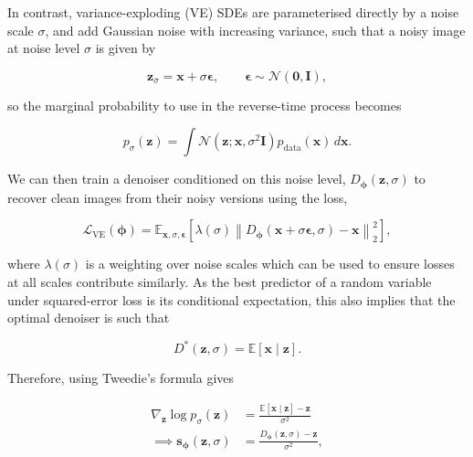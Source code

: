 In contrast, variance-exploding (VE) SDEs are parameterised directly by a noise scale $\sigma$, and add Gaussian noise with increasing variance, such that a noisy image at noise level $\sigma$ is given by

\begin{equation}
\mathbf{z}_\sigma=\mathbf{x}+\sigma\boldsymbol{\epsilon}, \qquad \boldsymbol{\epsilon}\sim\mathcal{N}(\mathbf{0},\mathbf{I}),
\label{eq:ve_noisy_image}
\end{equation}

so the marginal probability to use in the reverse-time process becomes

\begin{equation}
p_\sigma(\mathbf{z})=\int \mathcal{N}(\mathbf{z};\mathbf{x},\sigma^2\mathbf{I})p_{\mathrm{data}}(\mathbf{x})\,d\mathbf{x}.
\label{eq:ve_marginal}
\end{equation}

We can then train a denoiser conditioned on this noise level, $D_{\boldsymbol{\phi}}(\mathbf{z}, \sigma)$ to recover clean images from their noisy versions using the loss,

\begin{equation}
\mathcal L_{\mathrm{VE}}(\boldsymbol{\phi})=
\mathbb E_{\mathbf{x},\sigma,\boldsymbol{\epsilon}}
\left[
\lambda(\sigma)
\left\|D_{\boldsymbol{\phi}}(\mathbf{x}+\sigma\boldsymbol{\epsilon},\sigma)-\mathbf{x}\right\|_2^2
\right],
\label{eq:ve_denoising_loss}
\end{equation}

where $\lambda(\sigma)$ is a weighting over noise scales which can be used to ensure losses at all scales contribute similarly. As the best predictor of a random variable under squared-error loss is its conditional expectation, this also implies that the optimal denoiser is such that

\begin{equation}
D^*(\mathbf{z},\sigma)=\mathbb E[\mathbf{x}\mid \mathbf{z}].
\label{eq:optimal_denoiser_conditional_mean}
\end{equation}

Therefore, using Tweedie's formula \cite{} gives

\begin{align}
\nabla_{\mathbf{z}}\log p_\sigma(\mathbf{z})&=
\frac{\mathbb E[\mathbf{x}\mid \mathbf{z}]-\mathbf{z}}{\sigma^2}\\
\implies \mathbf{s}_{\boldsymbol{\phi}}(\mathbf{z},\sigma)&=
\frac{D_{\boldsymbol{\phi}}(\mathbf{z},\sigma)-\mathbf{z}}{\sigma^2},
\label{eq:score_from_denoiser}
\end{align}

